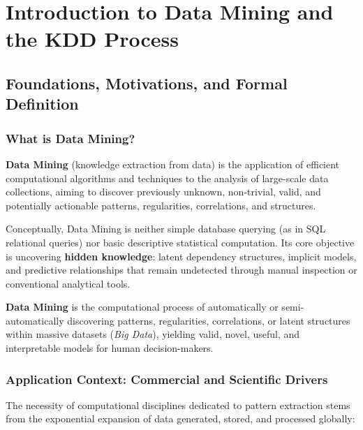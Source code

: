 \chapter{Introduction to Data Mining and the KDD Process}
\label{ch:intro-data-mining-en}

\section{Foundations, Motivations, and Formal Definition}

\subsection{What is Data Mining?}
\textbf{Data Mining} (knowledge extraction from data) is the application of efficient computational algorithms and techniques to the analysis of large-scale data collections, aiming to discover previously unknown, non-trivial, valid, and potentially actionable patterns, regularities, correlations, and structures.

Conceptually, Data Mining is neither simple database querying (as in SQL relational queries) nor basic descriptive statistical computation. Its core objective is uncovering \textbf{hidden knowledge}: latent dependency structures, implicit models, and predictive relationships that remain undetected through manual inspection or conventional analytical tools.

\begin{definition}
\textbf{Data Mining} is the computational process of automatically or semi-automatically discovering patterns, regularities, correlations, or latent structures within massive datasets (\textit{Big Data}), yielding valid, novel, useful, and interpretable models for human decision-makers.
\end{definition}

\subsection{Application Context: Commercial and Scientific Drivers}
The necessity of computational disciplines dedicated to pattern extraction stems from the exponential expansion of data generated, stored, and processed globally:

